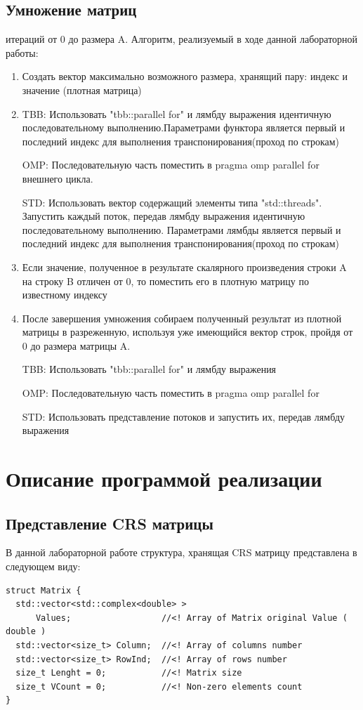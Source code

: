 \documentclass{report}
\begin{document}
\subsection*{Умножение матриц}
 итераций от 0 до размера A.
Алгоритм, реализуемый в ходе данной лабораторной работы:
\begin{enumerate}
\item Создать вектор максимально возможного размера, хранящий пару: индекс и значение (плотная матрица)
\item 
\par TBB: Использовать "tbb::parallel for" и лямбду выражения идентичную последовательному выполнению.Параметрами функтора является первый и последний индекс для выполнения транспонирования(проход по строкам)
\par OMP: Последовательную часть поместить в pragma omp parallel for внешнего цикла.
\par STD: Использовать вектор содержащий элементы типа "std::threads". Запустить каждый поток, передав лямбду выражения идентичную последовательному выполнению. Параметрами лямбды является первый и последний индекс для выполнения транспонирования(проход по строкам)
\item Если значение, полученное в результате скалярного произведения строки A на строку B отличен от 0, то поместить его в плотную матрицу по известному индексу
\item После завершения умножения собираем полученный результат из плотной матрицы в разреженную, используя уже имеющийся вектор строк, пройдя от 0 до размера матрицы A.
\par TBB: Использовать "tbb::parallel for" и лямбду выражения
\par OMP: Последовательную часть поместить в pragma omp parallel for
\par STD: Использовать представление потоков и запустить их, передав лямбду выражения
\end{enumerate}
\newpage
\section*{Описание программой реализации}
\subsection*{Представление CRS матрицы}
\par В данной лабораторной работе структура, хранящая CRS матрицу представлена в следующем виду:
\begin{lstlisting}
struct Matrix {
  std::vector<std::complex<double> >
      Values;                  //<! Array of Matrix original Value ( double )
  std::vector<size_t> Column;  //<! Array of columns number
  std::vector<size_t> RowInd;  //<! Array of rows number
  size_t Lenght = 0;           //<! Matrix size
  size_t VCount = 0;           //<! Non-zero elements count
}
\end{lstlisting}
\end{document}
